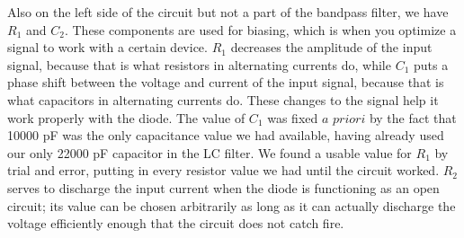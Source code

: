 \documentclass[11pt]{article}
\begin{document}
Also on the left side of the circuit but not a part of the bandpass filter, we have $R_1$ 
and $C_2$. These components are used for biasing, which is when you optimize
a signal to work with a certain device. $R_1$ decreases the amplitude of the input signal,
because that is what resistors in alternating currents do, while $C_1$ puts a phase
shift between the voltage and current of the input signal, because that is what capacitors
in alternating currents do. These changes to the signal help it work properly with the diode.
The value of $C_1$ was fixed $a$ $priori$ by the fact that 10000 pF was the only capacitance
value we had available, having already used our only 22000 pF capacitor in the LC filter. 
We found a usable value for $R_1$ by trial and error, putting in every resistor value we had
until the circuit worked. $R_2$ serves to discharge the input current when the diode is functioning
as an open circuit; its value can be chosen arbitrarily as long as it can actually discharge the
voltage efficiently enough that the circuit does not catch fire.
\\
\end{document}
